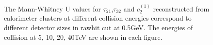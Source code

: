 \begin{figure}
\begin{center}
\end{center}
\caption{The Mann-Whitney U values for $\tau_{21}$,$\tau_{32}$ and $c_2^{(1)}$ reconstructed from calorimeter clusters at different collision energies correspond to different detector sizes in rawhit cut at 0.5GeV. The energies of collision at 5, 10, 20, 40TeV are shown in each figure.}
\label{fig:raw_U_summary}
\end{figure}

